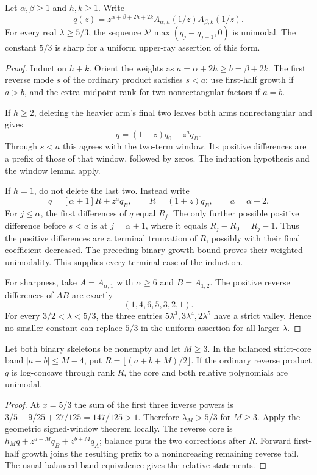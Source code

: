 \begin{theorem}\label{thm:binary-geometric-differences}
Let $\alpha,\beta\ge1$ and $h,k\ge1$. Write
\[
 q(z)=z^{\alpha+\beta+2h+2k}
          A_{\alpha,h}(1/z)A_{\beta,k}(1/z).
\]
For every real $\lambda\ge5/3$, the sequence
$\lambda^j\max(q_j-q_{j-1},0)$ is unimodal.
The constant $5/3$ is sharp for a uniform upper-ray assertion
of this form.
\end{theorem}
\begin{proof}
Induct on $h+k$. Orient the weights as $a=\alpha+2h\ge b=\beta+2k$.
The first reverse mode $s$ of the ordinary product satisfies $s<a$:
use first-half growth if $a>b$, and the extra midpoint rank for
two nonrectangular factors if $a=b$.

If $h\ge2$, deleting the heavier arm's final two leaves both
arms nonrectangular and gives
\[
 q=(1+z)q_0+z^a q_B.
\]
Through $s<a$ this agrees with the two-term window. Its positive
differences are a prefix of those of that window, followed by
zeros. The induction hypothesis and the window lemma apply.

If $h=1$, do not delete the last two. Instead write
\[
 q=[\alpha+1]R+z^a q_B,\qquad R=(1+z)q_B,
 \qquad a=\alpha+2.
\]
For $j\le\alpha$, the first differences of $q$ equal $R_j$.
The only further possible positive difference before $s<a$
is at $j=\alpha+1$, where it equals $R_j-R_0=R_j-1$.
Thus the positive differences are a terminal truncation of $R$,
possibly with their final coefficient decreased. The preceding
binary growth bound proves their weighted unimodality. This
supplies every terminal case of the induction.

For sharpness, take $A=A_{\alpha,1}$ with $\alpha\ge6$ and
$B=A_{1,2}$. The positive reverse differences of $AB$ are exactly
\[
                         (1,4,6,5,3,2,1).
\]
For every $3/2<\lambda<5/3$, the three entries
$5\lambda^3,3\lambda^4,2\lambda^5$ have a strict valley.
Hence no smaller constant can replace $5/3$ in the uniform
assertion for all larger $\lambda$.
\end{proof}

\begin{corollary}
Let both binary skeletons be nonempty and let $M\ge3$. In the
balanced strict-core band $|a-b|\le M-4$, put
$R=\lfloor(a+b+M)/2\rfloor$. If the ordinary reverse product
$q$ is log-concave through rank $R$, the core and both relative
polynomials are unimodal.
\end{corollary}
\begin{proof}
At $x=5/3$ the sum of the first three inverse powers is
$3/5+9/25+27/125=147/125>1$. Therefore $\lambda_M>5/3$
for $M\ge3$. Apply the geometric signed-window theorem locally.
The reverse core is $h_Mq+z^{a+M}q_B+z^{b+M}q_A$; balance puts
the two corrections after $R$. Forward first-half growth joins
the resulting prefix to a nonincreasing remaining reverse tail.
The usual balanced-band equivalence gives the relative statements.
\end{proof}

